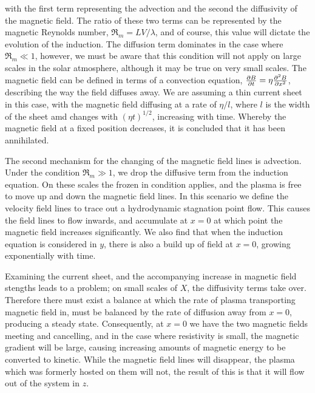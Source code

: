 \noindent with the first term representing the advection and the second the diffusivity of the magnetic field.
The ratio of these two terms can be represented by the magnetic Reynolds number, $\Re_m = LV/\lambda$, and of course, this value will dictate the evolution of the induction.
The diffusion term dominates in the case where $\Re_m \ll 1$, however, we must be aware that this condition will not apply on large scales in the solar atmosphere, although it may be true on very small scales.
The magnetic field can be defined in terms of a convection equation, $\frac{\partial B}{\partial t } = \eta\frac{\partial^2B}{\partial x^2}$, describing the way the field diffuses away.
We are assuming a thin current sheet in this case, with the magnetic field diffusing at a rate of $\eta/l$, where $l$ is the width of the sheet amd changes with $(\eta t)^{1/2}$, increasing with time.
Whereby the magnetic field at a fixed position decreases, it is concluded that it has been annihilated.

The second mechanism for the changing of the magnetic field lines is advection. 
Under the condition $\Re_m \gg 1$, we drop the diffusive term from the induction equation.
On these scales the frozen in condition applies, and the plasma is free to move up and down the magnetic field lines.
In this scenario we define the velocity field lines to trace out a hydrodynamic stagnation point flow.
This causes the field lines to flow inwards, and accumulate at $x = 0$ at which point the magnetic field increases significantly.
We also find that when the induction equation is considered in $y$, there is also a build up of field at $x = 0$, growing exponentially with time.

Examining the current sheet, and the accompanying increase in magnetic field stengths leads to a problem; on small scales of $X$, the diffusivity terms take over.
Therefore there must exist a balance at which the rate of plasma transporting magnetic field in, must be balanced by the rate of diffusion away from $x = 0$, producing a steady state.
Consequently, at $x = 0$ we have the two magnetic fields meeting and cancelling, and in the case where resistivity is small, the magnetic gradient will be large, causing increasing amounts of magnetic energy to be converted to kinetic.
While the magnetic field lines will disappear, the plasma which was formerly hosted on them will not, the result of this is that it will flow out of the system in $z$.

